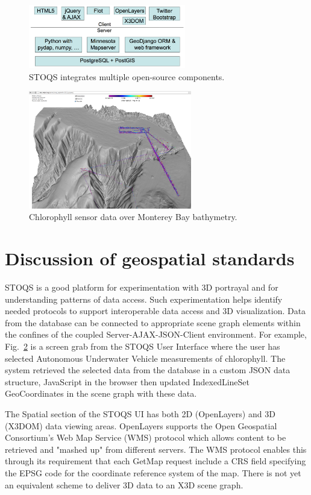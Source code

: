 \documentclass[annualconference]{acmsiggraph}  %
\begin{document}
\begin{figure}[htbp]
\centering
\includegraphics[width=2.7in]{stoqs_arch_simple.png}
\caption{STOQS integrates multiple open-source components.}
\label{fig:STOQSArch}
\end{figure}




\begin{figure}[htbp]
\centering
\includegraphics[width=2.8in]{Monterey25_lrauvs.png}
\caption{Chlorophyll sensor data over Monterey Bay bathymetry.}
\label{fig:Monterey25_lrauvs}
\end{figure}



\section{Discussion of geospatial standards}
STOQS is a good platform for experimentation with 3D portrayal and for understanding patterns of data access. Such experimentation helps identify needed protocols to support interoperable data access and 3D visualization.
Data from the database can be connected to appropriate scene graph elements within the confines of the coupled Server-AJAX-JSON-Client environment. For example, 
Fig.~\ref{fig:Monterey25_lrauvs} is a screen grab from the STOQS User Interface where the user has selected Autonomous Underwater Vehicle measurements of chlorophyll. The system retrieved the selected data from the database in a custom JSON data structure, JavaScript in the browser then updated IndexedLineSet GeoCoordinates in the scene graph with these data. 

The Spatial section of the STOQS UI has both 2D (OpenLayers) and 3D (X3DOM) data viewing areas. OpenLayers supports the Open Geospatial Consortium's Web Map Service (WMS) protocol which allows content to be retrieved and "mashed up" from different servers. The WMS protocol enables this through its requirement that each GetMap request include a CRS field specifying the EPSG code for the coordinate reference system of the map.  There is not yet an equivalent scheme to deliver 3D data to an X3D scene graph.
\end{document}
